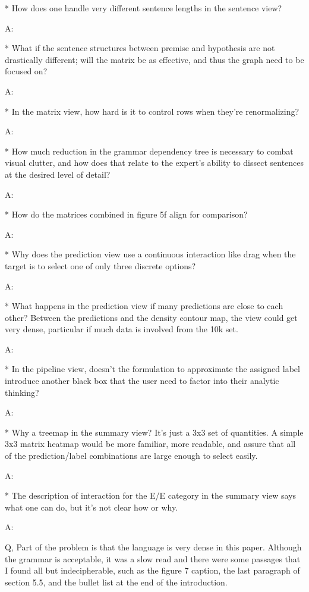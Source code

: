 * How does one handle very different sentence lengths in the sentence view?

A:

* What if the sentence structures between premise and hypothesis are not drastically different; will the matrix be as effective, and thus the graph need to be focused on?

A:

* In the matrix view, how hard is it to control rows when they're renormalizing?

A:

* How much reduction in the grammar dependency tree is necessary to combat visual clutter, and how does that relate to the expert's ability to dissect sentences at the desired level of detail?

A:

* How do the matrices combined in figure 5f align for comparison?

A:

* Why does the prediction view use a continuous interaction like drag when the target is to select one of only three discrete options?

A:

* What happens in the prediction view if many predictions are close to each other? Between the predictions and the density contour map, the view could get very dense, particular if much data is involved from the 10k set.

A:

* In the pipeline view, doesn't the formulation to approximate the assigned label introduce another black box that the user need to factor into their analytic thinking?

A:

* Why a treemap in the summary view? It's just a 3x3 set of quantities. A simple 3x3 matrix heatmap would be more familiar, more readable, and assure that all of the prediction/label combinations are large enough to select easily.

A:

* The description of interaction for the E/E category in the summary view says what one can do, but it's not clear how or why.

A:

Q, Part of the problem is that the language is very dense in this paper. Although the grammar is acceptable, it was a slow read and there were some passages that I found all but indecipherable, such as the figure 7 caption, the last paragraph of section 5.5, and the bullet list at the end of the introduction.


